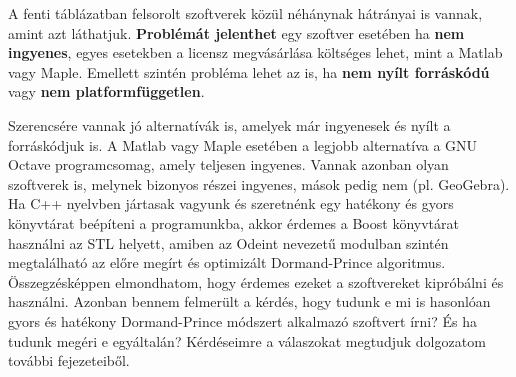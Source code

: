 A fenti táblázatban felsorolt szoftverek közül néhánynak hátrányai is vannak, amint azt láthatjuk. \textbf{Problémát jelenthet} egy szoftver esetében ha \textbf{nem ingyenes}, egyes esetekben a licensz megvásárlása költséges lehet, mint a Matlab vagy Maple. Emellett szintén probléma lehet az is, ha \textbf{nem nyílt forráskódú} vagy \textbf{nem platformfüggetlen}.

Szerencsére vannak jó alternatívák is, amelyek már ingyenesek és nyílt a forráskódjuk is. A Matlab vagy Maple esetében a legjobb alternatíva a GNU Octave programcsomag, amely teljesen ingyenes. Vannak azonban olyan szoftverek is, melynek bizonyos részei ingyenes, mások pedig nem (pl. GeoGebra). Ha C++ nyelvben jártasak vagyunk és szeretnénk egy hatékony és gyors könyvtárat beépíteni a programunkba, akkor érdemes a Boost könyvtárat használni az STL helyett, amiben az Odeint nevezetű modulban szintén megtalálható az előre megírt és optimizált Dormand-Prince algoritmus.
\newpage
Összegzésképpen elmondhatom, hogy érdemes ezeket a szoftvereket kipróbálni és használni. Azonban bennem felmerült a kérdés, hogy tudunk e mi is hasonlóan gyors és hatékony Dormand-Prince módszert alkalmazó szoftvert írni? És ha tudunk megéri e egyáltalán? Kérdéseimre a válaszokat megtudjuk dolgozatom további fejezeteiből.